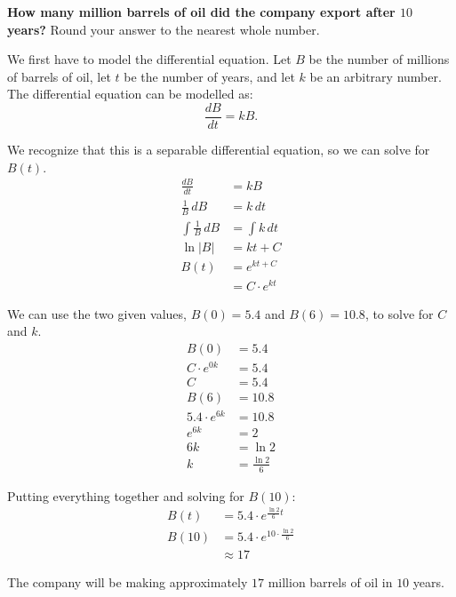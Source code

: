 \documentclass[12pt]{article}
\begin{document}
\begin{enumerate}
          \noindent \textbf{How many million barrels of oil did the company export after $10$ years?} Round your answer to the nearest whole number.

          \vspace{6mm}

          We first have to model the differential equation. Let $B$ be the number of millions of barrels of oil, let $t$ be the number of years, and let $k$ be an arbitrary number. The differential equation can be modelled as:
          \[ \frac{dB}{dt} = kB. \]

          We recognize that this is a separable differential equation, so we can solve for $B(t)$.
          \begin{align*}
              \frac{dB}{dt}          & = kB             \\[6pt]
              \frac{1}{B} \, dB      & = k \, dt        \\[6pt]
              \int \frac{1}{B} \, dB & = \int k \, dt   \\[6pt]
              \ln|B|                 & = kt + C         \\
              B(t)                   & = e^{kt + C}     \\
                                     & = C \cdot e^{kt}
          \end{align*}

          We can use the two given values, $B(0) = 5.4$ and $B(6) = 10.8$, to solve for $C$ and $k$.
          \begin{align*}
              B(0)             & = 5.4             \\
              C \cdot e^{0k}   & = 5.4             \\
              C                & = 5.4             \\[10pt]
              B(6)             & = 10.8            \\
              5.4 \cdot e^{6k} & = 10.8            \\
              e^{6k}           & = 2               \\
              6k               & = \ln 2           \\
              k                & = \frac{\ln 2}{6}
          \end{align*}

          Putting everything together and solving for $B(10)$:
          \begin{align*}
              B(t)  & = 5.4 \cdot e^{\frac{\ln 2}{6} t}        \\
              B(10) & = 5.4 \cdot e^{10 \cdot \frac{\ln 2}{6}} \\
                    & \approx 17
          \end{align*}

          The company will be making approximately $17$ million barrels of oil in $10$ years.
\end{enumerate}
\end{document}

